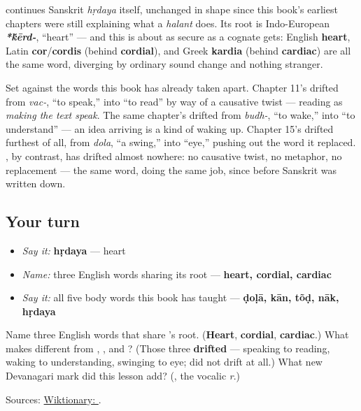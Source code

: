\begin{cousinweb}
\textbf{} continues Sanskrit \textbf{} \emph{hṛdaya} itself, unchanged in shape since this book's earliest chapters were still explaining what a \emph{halant} does. Its root is Indo-European \emph{\textbf{*\'{k}ērd-}}, \textquotedblleft{}heart\textquotedblright{} — and this is about as secure as a cognate gets: English \textbf{heart}, Latin \textbf{cor}/\textbf{cordis} (behind \textbf{cordial}), and Greek \textbf{kardia} (behind \textbf{cardiac}) are all the same word, diverging by ordinary sound change and nothing stranger.
\end{cousinweb}

\begin{culture}
Set \textbf{} against the words this book has already taken apart. Chapter 11's \textbf{} drifted from \emph{vac-}, \textquotedblleft{}to speak,\textquotedblright{} into \textquotedblleft{}to read\textquotedblright{} by way of a causative twist — reading as \emph{making the text speak}. The same chapter's \textbf{} drifted from \emph{budh-}, \textquotedblleft{}to wake,\textquotedblright{} into \textquotedblleft{}to understand\textquotedblright{} — an idea arriving is a kind of waking up. Chapter 15's \textbf{} drifted furthest of all, from \emph{dola}, \textquotedblleft{}a swing,\textquotedblright{} into \textquotedblleft{}eye,\textquotedblright{} pushing out the word it replaced. \textbf{}, by contrast, has drifted almost nowhere: no causative twist, no metaphor, no replacement — the same word, doing the same job, since before Sanskrit was written down.
\end{culture}

\subsection*{Your turn}
\begin{itemize}
\raggedright
  \item \emph{Say it:} \textbf{hṛdaya} — heart
  \item \emph{Name:} three English words sharing its root — \textbf{heart, cordial, cardiac}
  \item \emph{Say it:} all five body words this book has taught — \textbf{ḍoḷā, kān, tõḍ, nāk, hṛdaya}
\end{itemize}

\begin{tcolorbox}[breakable,colback=teal!4,colframe=teal!35!black,title={Before you move on}]
Name three English words that share \textbf{}'s root. (\textbf{Heart}, \textbf{cordial}, \textbf{cardiac}.) What makes \textbf{} different from \textbf{}, \textbf{}, and \textbf{}? (Those three \textbf{drifted} — speaking to reading, waking to understanding, swinging to eye; \textbf{} did not drift at all.) What new Devanagari mark did this lesson add? (\textbf{}, the vocalic \emph{r}.)

Sources: \href{https://en.wiktionary.org/wiki/\%E0\%A4\%B9\%E0\%A5\%83\%E0\%A4\%A6\%E0\%A4\%AF}{Wiktionary: }.
\end{tcolorbox}
